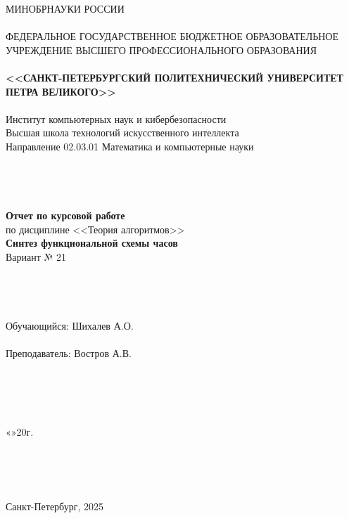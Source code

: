 \documentclass[11pt,a4paper,final]{article} %
\begin{document}
\thispagestyle{empty}

\begin{center}
{\Large МИНОБРНАУКИ РОССИИ}\\
~\\
{\large ФЕДЕРАЛЬНОЕ ГОСУДАРСТВЕННОЕ БЮДЖЕТНОЕ ОБРАЗОВАТЕЛЬНОЕ УЧРЕЖДЕНИЕ ВЫСШЕГО ПРОФЕССИОНАЛЬНОГО ОБРАЗОВАНИЯ}\\
~\\
{\Large \bf <<САНКТ-ПЕТЕРБУРГСКИЙ ПОЛИТЕХНИЧЕСКИЙ УНИВЕРСИТЕТ ПЕТРА ВЕЛИКОГО>>}\\
~\\
{\large Институт компьютерных наук и кибербезопасности }\\
{\large Высшая школа технологий искусственного интеллекта}\\
{\large Направление 02.03.01 Математика и компьютерные науки}\\
~\\
~\\
~\\
~\\
{\Large \bf  Отчет по курсовой работе}\\
\vspace{3mm}
{\Large {по дисциплине <<Теория алгоритмов>>}}\\
\vspace{3mm}
{\Large \bf Синтез функциональной схемы часов }\\
\vspace{3mm}
{\Large Вариант № 21}
~\\
~\\
~\\
~\\
~\\
{\large Обучающийся: \underline{\hspace{3.5cm}} \hspace{12mm} Шихалев А.О.}\\
~\\
{\large Преподаватель: \underline{\hspace{3.5cm}} \hspace{12mm} Востров А.В.}\\
~\\
~\\
~\\
~\\
\end{center}
\begin{flushright}

«\underline{\hspace{1cm}}»\underline{\hspace{3cm}}20\underline{\hspace{0.7cm}}г.
\end{flushright}
~\\
~\\
~\\
\begin{center}
{\large Санкт-Петербург, 2025}
\end{center}
\end{document}

